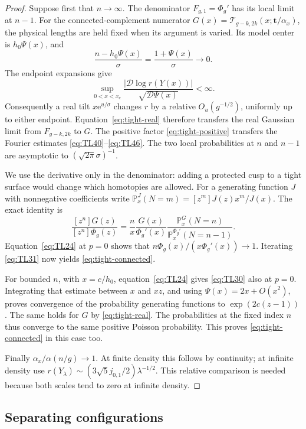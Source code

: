 \begin{proof}
Suppose first that $n\to\infty$. The denominator
$F_{g,1}=\Phi_g'$ has its local limit at $n-1$.
For the connected-complement numerator
$G(x)=\mathscr T_{g-k,2k}(x;\mathbf t/\alpha_x)$, the physical
lengths are held fixed when its argument is varied. Its model center
is $h_0\Psi(x)$, and
\[
 \frac{n-h_0\Psi(x)}\sigma
 =\frac{1+\Psi(x)}\sigma\longrightarrow0.
\]
The endpoint expansions give
\[
 \sup_{0<x<x_c}
 \frac{|\mathscr D\log r(Y(x))|}{\sqrt{\mathscr D\Psi(x)}}<\infty.
\]
Consequently a real tilt $x\mathrm e^{u/\sigma}$ changes $r$ by a
relative $O_u(g^{-1/2})$, uniformly up to either endpoint.
Equation~\eqref{eq:tight-real} therefore transfers the real Gaussian
limit from $F_{g-k,2k}$ to $G$. The positive factor
\eqref{eq:tight-positive} transfers the Fourier estimates
\eqref{eq:TL40}--\eqref{eq:TL46}. The two local probabilities at
$n$ and $n-1$ are asymptotic to $(\sqrt{2\pi}\sigma)^{-1}$.

We use the derivative only in the denominator: adding a protected cusp
to a tight surface would change which homotopies are allowed.
For a generating function $J$ with nonnegative coefficients write
$\mathbb P_x^J(N=m)=[z^m]J(z)x^m/J(x)$. The exact identity is
\begin{equation}
 \frac{[z^n]G(z)}{[z^n]\Phi_g(z)}
 =\frac n x\frac{G(x)}{\Phi_g'(x)}
       \frac{\mathbb P_x^G(N=n)}
            {\mathbb P_x^{\Phi_g'}(N=n-1)}.
 \label{eq:tight-coefficient}
\end{equation}
Equation~\eqref{eq:TL24} at $p=0$ shows that
$n\Phi_g(x)/(x\Phi_g'(x))\to1$. Iterating
\eqref{eq:TL31} now yields \eqref{eq:tight-connected}.

For bounded $n$, with $x=c/h_0$, equation~\eqref{eq:TL24} gives
\eqref{eq:TL30} also at $p=0$. Integrating that estimate between
$x$ and $xz$, and using $\Psi(x)=2x+O(x^2)$, proves convergence of
the probability generating functions to $\exp(2c(z-1))$.
The same holds for $G$ by \eqref{eq:tight-real}. The probabilities at
the fixed index $n$ thus converge to the same positive Poisson
probability. This proves \eqref{eq:tight-connected} in this case too.

Finally $\alpha_x/\alpha(n/g)\to1$. At finite density this follows
by continuity; at infinite density use $r(Y_\lambda)\sim
(3\sqrt5j_{0,1}/2)\lambda^{-1/2}$. This relative comparison is
needed because both scales tend to zero at infinite density.
\end{proof}

\subsection{Separating configurations}\label{subsec:tight-sep}

